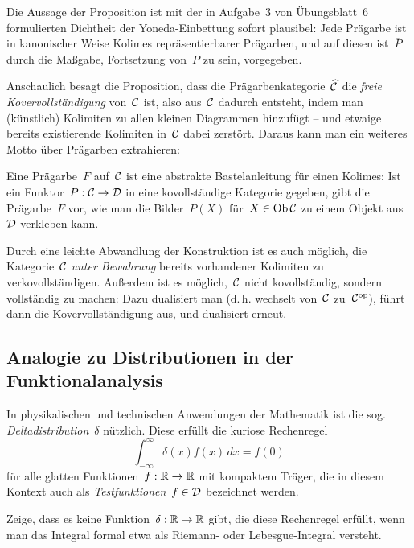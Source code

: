 Die Aussage der Proposition ist mit der in Aufgabe~3 von Übungsblatt~6
formulierten Dichtheit der Yoneda-Einbettung sofort plausibel: Jede Prägarbe
ist in kanonischer Weise Kolimes repräsentierbarer Prägarben, und auf diesen
ist~$\overline{P}$ durch die Maßgabe, Fortsetzung von~$P$ zu sein, vorgegeben.

Anschaulich besagt die Proposition, dass die Prägarbenkategorie~$\widehat{\mathcal{C}}$
die \emph{freie Kovervollständigung} von~$\mathcal{C}$ ist, also aus~$\mathcal{C}$ dadurch
entsteht, indem man (künstlich) Kolimiten zu allen kleinen Diagrammen hinzufügt
-- und etwaige bereits existierende Kolimiten in~$\mathcal{C}$ dabei zerstört. Daraus kann man ein
weiteres Motto über Prägarben extrahieren:
\begin{motto}Eine Prägarbe~$F$ auf~$\mathcal{C}$ ist eine abstrakte Bastelanleitung für einen
Kolimes: Ist ein Funktor~$P:\mathcal{C}\to\mathcal{D}$ in eine kovollständige Kategorie gegeben,
gibt die Prägarbe~$F$ vor, wie man die Bilder~$P(X)$ für~$X \in \operatorname{Ob}\mathcal{C}$ zu einem
Objekt aus~$\mathcal{D}$ verkleben kann.
\end{motto}

\begin{bem}
Durch eine leichte Abwandlung der Konstruktion ist es auch möglich, die
Kategorie~$\mathcal{C}$ \emph{unter Bewahrung} bereits vorhandener Kolimiten zu
verkovollständigen. Außerdem ist es möglich,~$\mathcal{C}$ nicht kovollständig, sondern
vollständig zu machen: Dazu dualisiert man (d.\,h. wechselt von~$\mathcal{C}$
zu~$\mathcal{C}^{\mathrm{op}}$), führt dann die Kovervollständigung
aus, und dualisiert erneut.
\end{bem}


\subsection{Analogie zu Distributionen in der Funktionalanalysis}

In physikalischen und technischen Anwendungen der Mathematik ist die sog.
\emph{Deltadistribution}~$\delta$ nützlich. Diese erfüllt die kuriose
Rechenregel
\[ \int_{-\infty}^\infty \delta(x) f(x) \,dx = f(0) \]
für alle glatten Funktionen~$f : \mathbb{R} \to \mathbb{R}$ mit kompaktem Träger, die in
diesem Kontext auch als \emph{Testfunktionen}~$f \in \mathcal{D}$ bezeichnet werden.

\begin{aufg}Zeige, dass es keine Funktion~$\delta : \mathbb{R} \to \mathbb{R}$ gibt, die
diese Rechenregel erfüllt, wenn man das Integral formal etwa als Riemann- oder
Lebesgue-Integral versteht.\end{aufg}

